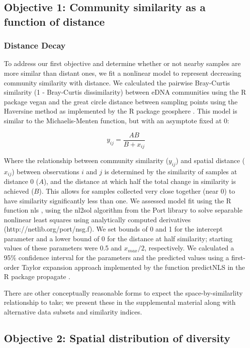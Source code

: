 \documentclass[11pt,letterpaper]{article} %
\begin{document}
\subsection*{Objective 1: Community similarity as a function of distance}
\subsubsection*{Distance Decay}
To address our first objective and determine whether or not nearby samples are more similar than distant ones, we fit a nonlinear model to represent decreasing community similarity with distance. We calculated the pairwise Bray-Curtis similarity (1 - Bray-Curtis dissimilarity) between eDNA communities using the R package vegan \citep{vegan} and the great circle distance between sampling points using the Haversine method as implemented by the R package geosphere \citep{geosphere}. This model is similar to the Michaelis-Menten function, but with an asymptote fixed at 0:

\begin{equation}\label{MM_asy0}
	y_{ij} = \frac{AB}{B + x_{ij}}
\end{equation}


Where the relationship between community similarity ($y_{ij}$) and spatial distance ($x_{ij}$) between observations $i$ and $j$ is determined by the similarity of samples at distance 0 ($A$), and the distance at which half the total change in similarity is achieved ($B$). This allows for samples collected very close together (near 0) to have similarity significantly less than one. We assessed model fit using the R function nls \citep{R}, using the nl2sol algorithm from the Port library to solve separable nonlinear least squares using analytically computed derivatives (http://netlib.org/port/nsg.f). We set bounds of 0 and 1 for the intercept parameter and a lower bound of 0 for the distance at half similarity; starting values of these parameters were 0.5 and $x_{max}/2$, respectively. We calculated a 95\% confidence interval for the parameters and the predicted values using a first-order Taylor expansion approach implemented by the function predictNLS in the R package propagate \citep{propagate}.


There are other conceptually reasonable forms to expect the space-by-similarlity relationship to take; we present these in the supplemental material along with alternative data subsets and similarity indices.

\subsection*{Objective 2: Spatial distribution of diversity}
\end{document}
